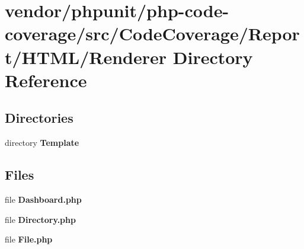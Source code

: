 \section{vendor/phpunit/php-\/code-\/coverage/src/\+Code\+Coverage/\+Report/\+H\+T\+M\+L/\+Renderer Directory Reference}
\label{dir_ea3093eea09bd496ed25d52f44469232}
\subsection*{Directories}
\begin{DoxyCompactItemize}
\item 
directory {\bf Template}
\end{DoxyCompactItemize}
\subsection*{Files}
\begin{DoxyCompactItemize}
\item 
file {\bf Dashboard.\+php}
\item 
file {\bf Directory.\+php}
\item 
file {\bf File.\+php}
\end{DoxyCompactItemize}
